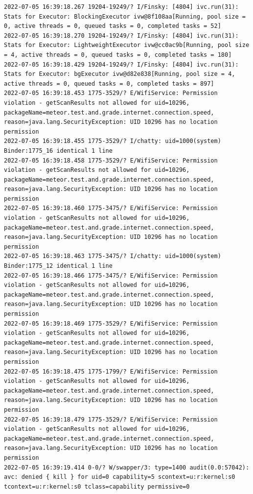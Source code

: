 \documentclass[a4paper,12pt]{book}
\begin{document}
\begin{lstlisting}
2022-07-05 16:39:18.267 19204-19249/? I/Finsky: [4804] ivc.run(31): Stats for Executor: BlockingExecutor ivw@8f108aa[Running, pool size = 0, active threads = 0, queued tasks = 0, completed tasks = 52]
2022-07-05 16:39:18.270 19204-19249/? I/Finsky: [4804] ivc.run(31): Stats for Executor: LightweightExecutor ivw@cc0ac9b[Running, pool size = 4, active threads = 0, queued tasks = 0, completed tasks = 180]
2022-07-05 16:39:18.429 19204-19249/? I/Finsky: [4804] ivc.run(31): Stats for Executor: bgExecutor ivw@d82e838[Running, pool size = 4, active threads = 0, queued tasks = 0, completed tasks = 897]
2022-07-05 16:39:18.453 1775-3529/? E/WifiService: Permission violation - getScanResults not allowed for uid=10296, packageName=meteor.test.and.grade.internet.connection.speed, reason=java.lang.SecurityException: UID 10296 has no location permission
2022-07-05 16:39:18.455 1775-3529/? I/chatty: uid=1000(system) Binder:1775_16 identical 1 line
2022-07-05 16:39:18.458 1775-3529/? E/WifiService: Permission violation - getScanResults not allowed for uid=10296, packageName=meteor.test.and.grade.internet.connection.speed, reason=java.lang.SecurityException: UID 10296 has no location permission
2022-07-05 16:39:18.460 1775-3475/? E/WifiService: Permission violation - getScanResults not allowed for uid=10296, packageName=meteor.test.and.grade.internet.connection.speed, reason=java.lang.SecurityException: UID 10296 has no location permission
2022-07-05 16:39:18.463 1775-3475/? I/chatty: uid=1000(system) Binder:1775_12 identical 1 line
2022-07-05 16:39:18.466 1775-3475/? E/WifiService: Permission violation - getScanResults not allowed for uid=10296, packageName=meteor.test.and.grade.internet.connection.speed, reason=java.lang.SecurityException: UID 10296 has no location permission
2022-07-05 16:39:18.469 1775-3529/? E/WifiService: Permission violation - getScanResults not allowed for uid=10296, packageName=meteor.test.and.grade.internet.connection.speed, reason=java.lang.SecurityException: UID 10296 has no location permission
2022-07-05 16:39:18.475 1775-1799/? E/WifiService: Permission violation - getScanResults not allowed for uid=10296, packageName=meteor.test.and.grade.internet.connection.speed, reason=java.lang.SecurityException: UID 10296 has no location permission
2022-07-05 16:39:18.479 1775-3529/? E/WifiService: Permission violation - getScanResults not allowed for uid=10296, packageName=meteor.test.and.grade.internet.connection.speed, reason=java.lang.SecurityException: UID 10296 has no location permission
2022-07-05 16:39:19.414 0-0/? W/swapper/3: type=1400 audit(0.0:57042): avc: denied { kill } for uid=0 capability=5 scontext=u:r:kernel:s0 tcontext=u:r:kernel:s0 tclass=capability permissive=0

\end{lstlisting}
\end{document}
